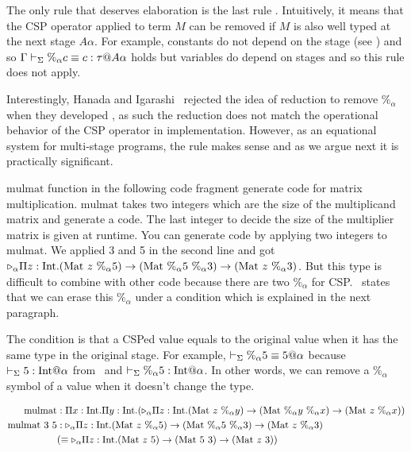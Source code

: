 The only rule that deserves elaboration is the last rule \QPercent.
Intuitively, it means that the CSP operator applied to term $M$ can be
removed if $M$ is also well typed at the next stage \(A\alpha\).
For example, constants do not depend on the stage (see \TConst) and
so \(\Gamma\vdash_\Sigma \%_\alpha c \equiv c : \tau @ A\alpha\) holds but variables
do depend on stages and so this rule does not apply.

Interestingly, Hanada and Igarashi~\cite{Hanada2014} rejected the idea of
reduction to remove $\%_\alpha$ when they developed \LTP{}, as such
the reduction does not match the operational behavior of the CSP operator
in implementation.  However, as an equational system for multi-stage
programs, the rule \QPercent makes sense and as we argue next
it is practically significant.


$\text{mulmat}$ function in the following code fragment generate code for matrix multiplication.
$\text{mulmat}$ takes two integers which are the size of the multiplicand matrix and generate a code.
The last integer to decide the size of the multiplier matrix is given at runtime.
You can generate code by applying two integers to $\text{mulmat}$.
We applied 3 and 5 in the second line and got ${\mathop{\triangleright}}_\alpha \Pi z:\textrm{Int}.(\textrm{Mat}\ z\ \%_\alpha 5) \to (\textrm{Mat}\ \%_\alpha 5\ \%_\alpha 3) \to (\textrm{Mat}\ z\ \%_\alpha 3)$.
But this type is difficult to combine with other code because there are two $\%_\alpha$ for CSP.
\QPercent\ states that we can erase this $\%_\alpha$ under a condition which is explained in the next paragraph.

The condition is that a CSPed value equals to the original value when it has the same type in the original stage.
For example, $\vdash_\Sigma \%_\alpha 5 \equiv 5 @ \alpha$ because $ \vdash_\Sigma 5 : \textrm{Int} @ \alpha $ from \TConst\ and  $ \vdash_\Sigma \%_\alpha 5 : \textrm{Int} @ \alpha$.
In other words, we can remove a $\%_\alpha$ symbol of a value when it doesn't change the type.

    {
        \begin{align*}
            \text{mulmat}       & : \Pi x:\textrm{Int}.\Pi y:\textrm{Int}.({\mathop{\triangleright}}_\alpha \Pi z:\textrm{Int}.(\textrm{Mat}\ z\ \%_\alpha y) \to (\textrm{Mat}\ \%_\alpha y\ \%_\alpha x) \to (\textrm{Mat}\ z\ \%_\alpha x)) \\
            \text{mulmat}\ 3\ 5 & : {\mathop{\triangleright}}_\alpha \Pi z:\textrm{Int}.(\textrm{Mat}\ z\ \%_\alpha 5) \to (\textrm{Mat}\ \%_\alpha 5\ \%_\alpha 3) \to (\textrm{Mat}\ z\ \%_\alpha 3)                     \\
                                & (\equiv {\mathop{\triangleright}}_\alpha \Pi z:\textrm{Int}.(\textrm{Mat}\ z\ 5) \to (\textrm{Mat}\ 5\ 3) \to (\textrm{Mat}\ z\ 3) )                                                         \\
        \end{align*}
    }

